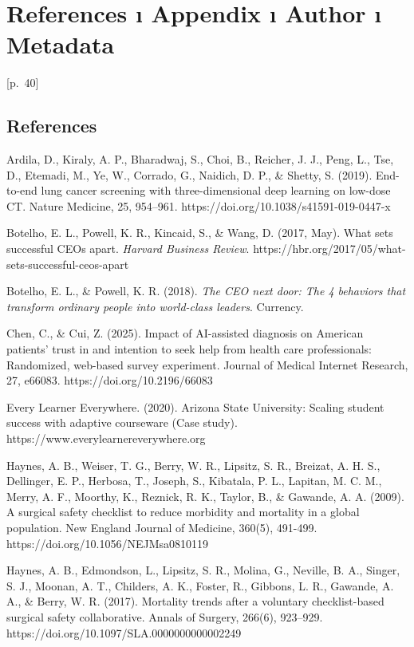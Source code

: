 \documentclass[
  letterpaper,
  DIV=11,
  numbers=noendperiod]{scrreprt}
\begin{document}

\chapter{References ı Appendix ı Author ı
Metadata}\label{references-ux131-appendix-ux131-author-ux131-metadata}

{[}p.~40{]}

\section{References}\label{references}

Ardila, D., Kiraly, A. P., Bharadwaj, S., Choi, B., Reicher, J. J.,
Peng, L., Tse, D., Etemadi, M., Ye, W., Corrado, G., Naidich, D. P., \&
Shetty, S. (2019). End-to-end lung cancer screening with
three-dimensional deep learning on low-dose CT. Nature Medicine, 25,
954--961. https://doi.org/10.1038/s41591-019-0447-x

Botelho, E. L., Powell, K. R., Kincaid, S., \& Wang, D. (2017, May).
What sets successful CEOs apart. \emph{Harvard Business Review}.
https://hbr.org/2017/05/what-sets-successful-ceos-apart

Botelho, E. L., \& Powell, K. R. (2018). \emph{The CEO next door: The 4
behaviors that transform ordinary people into world-class leaders}.
Currency.

Chen, C., \& Cui, Z. (2025). Impact of AI-assisted diagnosis on American
patients' trust in and intention to seek help from health care
professionals: Randomized, web-based survey experiment. Journal of
Medical Internet Research, 27, e66083. https://doi.org/10.2196/66083

Every Learner Everywhere. (2020). Arizona State University: Scaling
student success with adaptive courseware (Case study).
https://www.everylearnereverywhere.org

Haynes, A. B., Weiser, T. G., Berry, W. R., Lipsitz, S. R., Breizat, A.
H. S., Dellinger, E. P., Herbosa, T., Joseph, S., Kibatala, P. L.,
Lapitan, M. C. M., Merry, A. F., Moorthy, K., Reznick, R. K., Taylor,
B., \& Gawande, A. A. (2009). A surgical safety checklist to reduce
morbidity and mortality in a global population. New England Journal of
Medicine, 360(5), 491-499. https://doi.org/10.1056/NEJMsa0810119

Haynes, A. B., Edmondson, L., Lipsitz, S. R., Molina, G., Neville, B.
A., Singer, S. J., Moonan, A. T., Childers, A. K., Foster, R., Gibbons,
L. R., Gawande, A. A., \& Berry, W. R. (2017). Mortality trends after a
voluntary checklist-based surgical safety collaborative. Annals of
Surgery, 266(6), 923--929. https://doi.org/10.1097/SLA.0000000000002249
\end{document}
